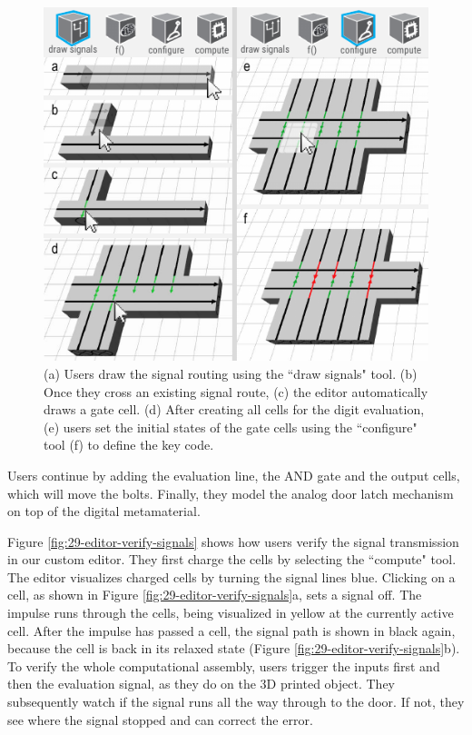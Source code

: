 \begin{figure} [h]
    \includegraphics[width=\textwidth]{chapters/digital-metamaterials-FIG/28-editor-draw-signals.pdf}
    \caption[Short figure name.]{(a) Users draw the signal routing using the ``draw signals" tool. (b) Once they cross an existing signal route, (c) the editor automatically draws a gate cell. (d) After creating all cells for the digit evaluation, (e) users set the initial states of the gate cells using the ``configure" tool (f) to define the key code.
    \label{fig:28-editor-draw-signals}}
\end{figure}

Users continue by adding the evaluation line, the AND gate and the output cells, which will move the bolts. Finally, they model the analog door latch mechanism on top of the digital metamaterial. 

Figure \ref{fig:29-editor-verify-signals} shows how users verify the signal transmission in our custom editor. They first charge the cells by selecting the ``compute" tool. The editor visualizes charged cells by turning the signal lines blue. Clicking on a cell, as shown in Figure \ref{fig:29-editor-verify-signals}a, sets a signal off. The impulse runs through the cells, being visualized in yellow at the currently active cell. After the impulse has passed a cell, the signal path is shown in black again, because the cell is back in its relaxed state (Figure \ref{fig:29-editor-verify-signals}b). To verify the whole computational assembly, users trigger the inputs first and then the evaluation signal, as they do on the 3D printed object. They subsequently watch if the signal runs all the way through to the door. If not, they see where the signal stopped and can correct the error. 

